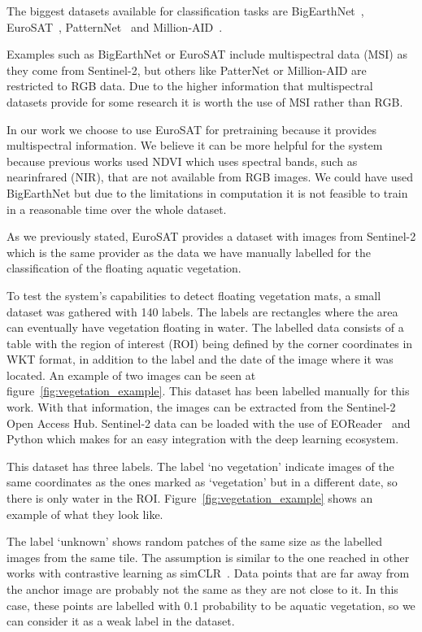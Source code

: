 \documentclass[conference]{IEEEtran}
\begin{document}
    The biggest datasets available for classification tasks are BigEarthNet~\cite{bigearthnet}, EuroSAT~\cite{helber2019eurosat},
    PatternNet~\cite{patternet} and Million-AID~\cite{millionaid}.

    Examples such as BigEarthNet or EuroSAT include multispectral data (MSI) as they come from Sentinel-2, but others like PatterNet or Million-AID are restricted to RGB data.
    Due to the higher information that multispectral datasets provide for some research it is worth the use of MSI rather than RGB\@.

    In our work we choose to use EuroSAT for pretraining because it provides multispectral information.
    We believe it can be more helpful for the system because previous works used NDVI which uses spectral bands, such as nearinfrared (NIR), that are not available from RGB images.
    We could have used BigEarthNet but due to the limitations in computation it is not feasible to train in a reasonable time over the whole dataset.

    As we previously stated, EuroSAT provides a dataset with images from Sentinel-2 which is the same provider as the data
    we have manually labelled for the classification of the floating aquatic vegetation.

    To test the system's capabilities to detect floating vegetation mats, a small dataset was gathered with 140 labels.
    The labels are rectangles where the area can eventually have vegetation floating in water.
    The labelled data consists of a table with the region of interest (ROI) being defined by the corner coordinates in WKT format, in addition to
    the label and the date of the image where it was located.
    An example of two images can be seen at figure~\ref{fig:vegetation_example}.
    This dataset has been labelled manually for this work.
    With that information, the images can be extracted from the Sentinel-2 Open Access Hub.
    Sentinel-2 data can be loaded with the use of EOReader~\cite{eoreader_paper} and Python which makes for an easy integration with the deep learning ecosystem.

    This dataset has three labels.
    The label `no vegetation' indicate images of the same coordinates as the ones marked as `vegetation' but in a different date, so there is only water in the ROI\@.
    Figure~\ref{fig:vegetation_example} shows an example of what they look like.

    The label `unknown' shows random patches of the same size as the labelled images from the same tile.
    The assumption is similar to the one reached in other works with contrastive learning as simCLR~\cite{chen2020simple, jean2019tile2vec}.
    Data points that are far away from the anchor image are probably not the same as they are not close to it.
    In this case, these points are labelled with 0.1 probability to be aquatic vegetation, so we can consider it as a weak label in the dataset.
\end{document}

